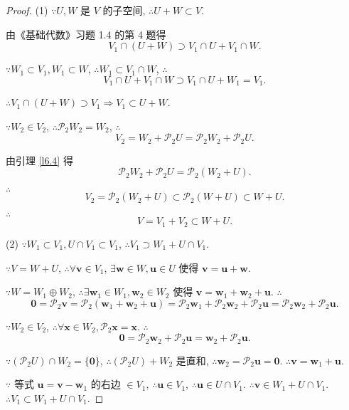 \documentclass[color=black,device=normal,lang=cn,mode=geye]{elegantnote}
\begin{document}
\begin{proof}
    (1) $\because U,W$ 是 $V$ 的子空间, $\therefore U+W\subset V$.

    由《基础代数》习题 1.4 的第 4 题得
    \[V_1\cap(U+W)\supset V_1\cap U+V_1\cap W.\]

    $\because W_1\subset V_1,W_1\subset W$, $\therefore W_1\subset V_1\cap W$, $\therefore$
    \[V_1\cap U+V_1\cap W\supset V_1\cap U+W_1=V_1.\]

    $\therefore V_1\cap(U+W)\supset V_1\Rightarrow V_1\subset U+W$.

    $\because W_2\in V_2$, $\therefore\mathcal{P}_2W_2=W_2$, $\therefore$
    \[V_2=W_2+\mathcal{P}_2U=\mathcal{P}_2W_2+\mathcal{P}_2U.\]
    
    由引理 \ref{l6.4} 得
    \[\mathcal{P}_2W_2+\mathcal{P}_2U=\mathcal{P}_2(W_2+U).\]

    $\therefore$
    \[V_2=\mathcal{P}_2(W_2+U)\subset\mathcal{P}_2(W+U)\subset W+U.\]

    $\therefore$
    \[V=V_1+V_2\subset W+U.\]

    (2) $\because W_1\subset V_1,U\cap V_1\subset V_1$, $\therefore V_1\supset W_1+U\cap V_1$.

    $\because V=W+U$, $\therefore\forall\boldsymbol{v}\in V_1$, $\exists\boldsymbol{w}\in W,\boldsymbol{u}\in U$ 使得 $\boldsymbol{v}=\boldsymbol{u}+\boldsymbol{w}$.
    
    $\because W=W_1\oplus W_2$, $\therefore\exists\boldsymbol{w}_1\in W_1,\boldsymbol{w}_2\in W_2$ 使得 $\boldsymbol{v}=\boldsymbol{w}_1+\boldsymbol{w}_2+\boldsymbol{u}$. $\therefore$
    \[\boldsymbol{0}=\mathcal{P}_2\boldsymbol{v}=\mathcal{P}_2(\boldsymbol{w}_1+\boldsymbol{w}_2+\boldsymbol{u})=\mathcal{P}_2\boldsymbol{w}_1+\mathcal{P}_2\boldsymbol{w}_2+\mathcal{P}_2\boldsymbol{u}=\mathcal{P}_2\boldsymbol{w}_2+\mathcal{P}_2\boldsymbol{u}.\]

    $\because W_2\in V_2$, $\therefore\forall\boldsymbol{x}\in W_2,\mathcal{P}_2\boldsymbol{x}=\boldsymbol{x}$. $\therefore$
    \[\boldsymbol{0}=\mathcal{P}_2\boldsymbol{w}_2+\mathcal{P}_2\boldsymbol{u}=\boldsymbol{w}_2+\mathcal{P}_2\boldsymbol{u}.\]
    
    $\because(\mathcal{P}_2U)\cap W_2=\{\boldsymbol{0}\}$, $\therefore(\mathcal{P}_2U)+W_2$ 是直和, $\therefore\boldsymbol{w}_2=\mathcal{P}_2\boldsymbol{u}=\boldsymbol{0}$. $\therefore\boldsymbol{v}=\boldsymbol{w}_1+\boldsymbol{u}$.

    $\because$ 等式 $\boldsymbol{u}=\boldsymbol{v}-\boldsymbol{w}_1$ 的右边 $\in V_1$, $\therefore\boldsymbol{u}\in V_1$, $\therefore\boldsymbol{u}\in U\cap V_1$. $\therefore\boldsymbol{v}\in W_1+U\cap V_1$. $\therefore V_1\subset W_1+U\cap V_1$.


\end{proof}
\end{document}
